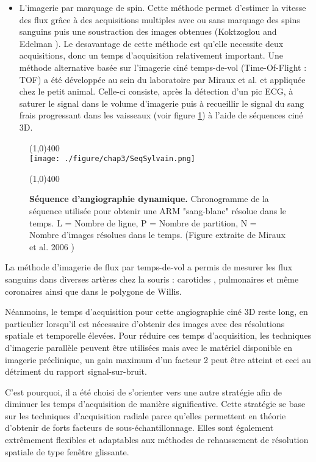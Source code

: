 \begin{itemize}
\item L’imagerie par marquage de spin. Cette méthode permet d’estimer la vitesse des flux grâce à des acquisitions multiples avec ou sans marquage des spins sanguins puis une soustraction des images obtenues (Koktzoglou and Edelman \cite{Koktzoglou:2009fe}). Le desavantage de cette méthode est qu’elle necessite deux acquisitions, donc un temps d’acquisition relativement important.
Une méthode alternative basée sur l’imagerie ciné temps-de-vol (Time-Of-Flight : TOF) a été développée au sein du laboratoire par  Miraux et al. \cite{Miraux:2006fu} et appliquée chez le petit animal. Celle-ci consiste, après la détection d’un pic ECG, à saturer le signal dans le volume d'imagerie puis à recueillir le signal du sang frais progressant dans les vaisseaux (voir figure \ref{fig:SeqSylvain}) à l’aide de séquences ciné 3D.
\end{itemize}

\begin{figure}[H]
\centering
\line(1,0){400} \\
\texttt{[image: ./figure/chap3/SeqSylvain.png]}
\caption[Séquence d'angiographie dynamique.]{\label{fig:SeqSylvain} \textbf{Séquence d'angiographie dynamique.} Chronogramme de la séquence utilisée pour obtenir une ARM "sang-blanc" résolue dans le temps. L = Nombre de ligne, P = Nombre de partition, N = Nombre d'images résolues dans le temps. (Figure extraite de Miraux et al. 2006 \cite{Miraux:2006fu})}
\line(1,0){400} \\ \end{figure}

La méthode d'imagerie de flux par temps-de-vol a permis de mesurer les flux sanguins dans diverses artères chez la souris : carotides \cite{Miraux:2006fu}, pulmonaires \cite{Cochet:2013dk} et même coronaires \cite{Cochet:2010ec} ainsi que dans le polygone de Willis.

Néanmoins, le temps d’acquisition pour cette angiographie ciné 3D reste long, en particulier lorsqu’il est nécessaire d’obtenir des images avec des résolutions spatiale et temporelle élevées. Pour réduire ces temps d’acquisition, les techniques d’imagerie parallèle peuvent être utilisées mais avec le matériel disponible en imagerie préclinique, un gain maximum d’un facteur 2 peut être atteint et ceci au détriment du rapport signal-sur-bruit. 

C’est pourquoi, il a été choisi de s'orienter vers une autre stratégie afin de diminuer les temps d’acquisition de manière significative. Cette stratégie se base sur les techniques d’acquisition radiale parce qu’elles permettent en théorie d’obtenir de forts facteurs de sous-échantillonnage. Elles sont également extrêmement flexibles et adaptables aux méthodes de rehaussement de résolution spatiale de type fenêtre glissante.

